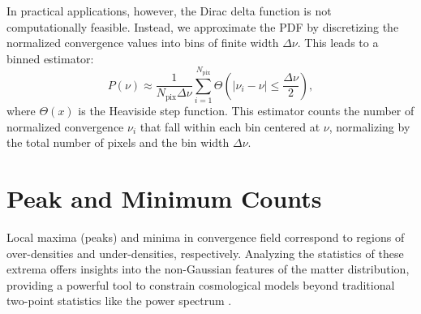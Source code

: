In practical applications, however, the Dirac delta function is not computationally feasible. Instead, we approximate the PDF by discretizing the normalized convergence values into bins of finite width \(\Delta\nu\). This leads to a binned estimator:
\begin{equation}
    P(\nu) \approx \frac{1}{N_{\mathrm{pix}} \Delta\nu} \sum_{i=1}^{N_{\mathrm{pix}}} \Theta\left(\left|\nu_i - \nu\right| \leq \frac{\Delta\nu}{2}\right),
    \label{eq:pdf_binned}
\end{equation}
where \(\Theta(x)\) is the Heaviside step function. This estimator counts the number of normalized convergence \(\nu_i\) that fall within each bin centered at \(\nu\), normalizing by the total number of pixels and the bin width \(\Delta\nu\).

\section{Peak and Minimum Counts}
\label{sec:peak_min_counts}
Local maxima (peaks) and minima in convergence field correspond to regions of over-densities and under-densities, respectively. Analyzing the statistics of these extrema offers insights into the non-Gaussian features of the matter distribution, providing a powerful tool to constrain cosmological models beyond traditional two-point statistics like the power spectrum \citep{2000ApJ...530L...1J, 2010MNRAS.402.1049D}.

